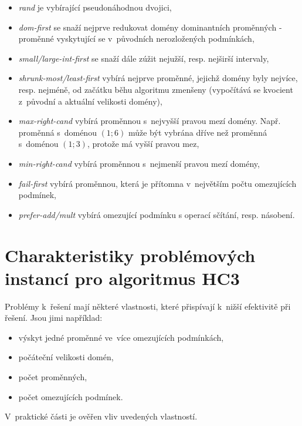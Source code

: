 \begin{itemize}
  \item \emph{rand} je  vybírající pseudonáhodnou dvojici,
  \item \emph{dom-first} \cite{feiten10} se snaží nejprve redukovat domény dominantních proměnných - proměnné vyskytující se v~původních nerozložených podmínkách,
  \item \emph{small/large-int-first} \cite{feiten10} se snaží dále zúžit nejužší, resp. nejširší intervaly,
  \item \emph{shrunk-most/least-first} \cite{feiten10} vybírá nejprve proměnné, jejichž domény byly nejvíce, resp. nejméně, od začátku běhu algoritmu zmenšeny (vypočítává se kvocient z~původní a aktuální velikosti domény),
  \item \emph{max-right-cand} \cite{feiten10} vybírá proměnnou s~nejvyšší pravou mezí domény. Např. proměnná s~doménou $(1;6)$ může být vybrána dříve než proměnná s~doménou $(1;3)$, protože má vyšší pravou mez,
  \item \emph{min-right-cand} \cite{feiten10} vybírá proměnnou s~nejmenší pravou mezí domény,
  \item \emph{fail-first} vybírá proměnnou, která je přítomna v~největším počtu omezujících podmínek,
  \item \emph{prefer-add/mult} vybírá omezující podmínku s operací sčítání, resp. násobení.
\end{itemize}


\section{Charakteristiky problémových instancí pro algoritmus HC3}

Problémy k~řešení mají některé vlastnosti, které přispívají k~nižší efektivitě při řešení. Jsou jimi například:


\begin{itemize}
  \item výskyt jedné proměnné ve~více omezujících podmínkách,
  \item počáteční velikosti domén,
  \item počet proměnných,
  \item počet omezujících podmínek.
\end{itemize}

V~praktické části je ověřen vliv uvedených vlastností.

